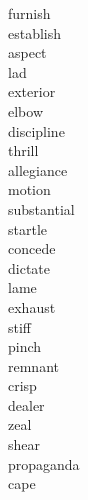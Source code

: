 \documentclass[a4paper, 11pt]{ctexart}
\begin{document}
\clearpage

\begin{multicols*}{3}
    \begin{description}

\item[furnish]

\item[establish]

\item[aspect]

\item[lad]

\item[exterior]

\item[elbow]

\item[discipline]

\item[thrill]

\item[allegiance]

\item[motion]

\item[substantial]

\item[startle]

\item[concede]

\item[dictate]

\item[lame]

\item[exhaust]

\item[stiff]

\item[pinch]

\item[remnant]

\item[crisp]

\item[dealer]

\item[zeal]

\item[shear]

\item[propaganda]

\item[cape]


\end{description}
\end{multicols*}
\end{document}
